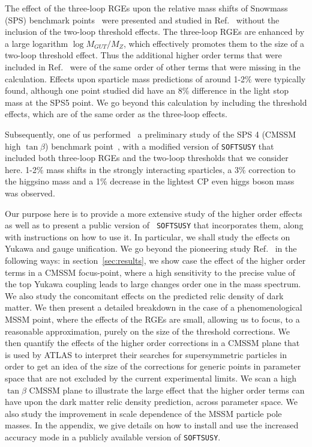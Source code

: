 \documentclass[final,3p,times,pdflatex]{elsarticle}
\begin{document}
The effect of the three-loop RGEs upon the relative mass shifts 
of Snowmass (SPS) benchmark 
points~\cite{Allanach:2002nj} were presented and studied in 
Ref.~\cite{Jack:2004ch} 
without the inclusion of the two-loop threshold effects. 
The three-loop RGEs are enhanced by a large logarithm $\log M_{GUT}/M_Z$,
which effectively promotes them to the size of a two-loop threshold effect. 
Thus the additional higher order terms that were included in
Ref.~\cite{Jack:2004ch} were of the same order of other terms that were
missing in the calculation. Effects upon sparticle mass predictions of around
1-2$\%$ were typically found, although one point studied did have an 8$\%$
difference in the light stop mass at the SPS5 point. 
We go beyond this calculation by including the threshold effects, which are of
the same order as the three-loop effects.

Subsequently, one of us performed~\cite{Bednyakov:2010ni} a preliminary study
of the SPS 4 (CMSSM high
$\tan \beta$) benchmark
point~\cite{Allanach:2002nj}, with a modified version of {\tt SOFTSUSY} that
included both three-loop RGEs and the two-loop thresholds that we consider
here. 1-2$\%$ mass shifts in the strongly interacting sparticles, a 3$\%$
correction to the higgsino mass and a 1$\%$ decrease in the lightest CP even
higgs boson mass was observed. 

Our purpose here is to provide a more extensive
study of the higher order effects as well as to present a public version of {\tt
  SOFTSUSY} that incorporates them, along with instructions on how to use it.
In particular, we shall study the effects on Yukawa and gauge unification. 
We go beyond the pioneering study Ref.~\cite{Bednyakov:2010ni} in the
following ways: in section~\ref{sec:results}, we show case the effect of the
higher order terms in a CMSSM  
focus-point, where a high sensitivity to the precise value of the top Yukawa
coupling leads to large changes order one in the mass spectrum. 
We also study the concomitant effects on the predicted relic density of
dark matter.
We then present a detailed
breakdown in the case of a phenomenological MSSM point, where the effects of
the RGEs are 
small, allowing us to focus, to a reasonable approximation, purely on the size
of the threshold corrections. We then quantify the effects of the higher order
corrections in a CMSSM plane that is used by ATLAS to interpret their searches
for supersymmetric particles in order to get an idea of the size of the
corrections for generic points in parameter space that are not excluded by the
current experimental limits. 
We scan a high $\tan \beta$ CMSSM plane to illustrate the large effect that the
higher order terms can have upon the dark matter relic density prediction,
across parameter space. 
We also study the improvement in scale dependence
of the MSSM particle pole masses.  
In the appendix, we give details on how to install and use the increased
accuracy mode in a publicly available version of {\tt SOFTSUSY}.
\end{document}
